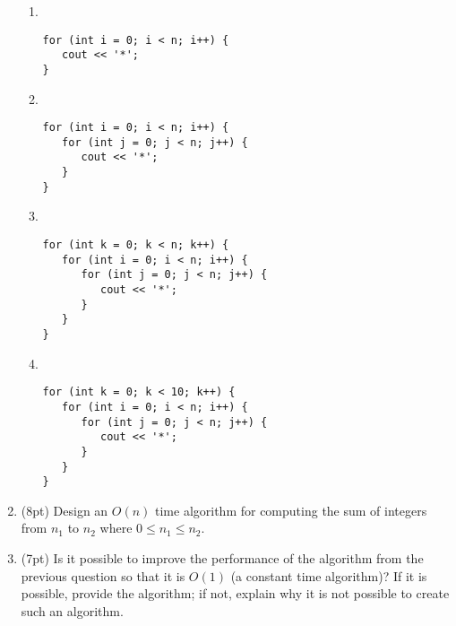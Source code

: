 \documentclass{article}
\newcommand{\pts}[1]{\addtocounter{points}{#1}(#1pt)}
\newcommand{\tspace}{\vspace{4cm}}
\begin{document}
\begin{spacing}{1.1}
\begin{enumerate}[leftmargin=*]
\begin{enumerate}

\item ~

\vspace{-\baselineskip}
\begin{lstlisting}[xleftmargin=.25in]
for (int i = 0; i < n; i++) {
   cout << '*';
}
\end{lstlisting} 

\tspace

\item ~

\vspace{-\baselineskip}
\begin{lstlisting}[xleftmargin=.25in]
for (int i = 0; i < n; i++) {
   for (int j = 0; j < n; j++) {
      cout << '*';
   }
}
\end{lstlisting} 

\tspace

\item ~

\vspace{-\baselineskip}
\begin{lstlisting}[numbers=none]
for (int k = 0; k < n; k++) {
   for (int i = 0; i < n; i++) {
      for (int j = 0; j < n; j++) {
         cout << '*';
      }
   }
}
\end{lstlisting} 

\tspace

\item ~

\vspace{-\baselineskip}
\begin{lstlisting}[numbers=none]
for (int k = 0; k < 10; k++) {
   for (int i = 0; i < n; i++) {
      for (int j = 0; j < n; j++) {
         cout << '*';
      }
   }
}
\end{lstlisting} 

\tspace

\end{enumerate}

\newpage

\item \pts{8} Design an $O(n)$ time algorithm for computing the sum of
  integers from $n_1$ to $n_2$ where $0 \le n_1 \le n_2$.

\tspace

\item \pts{7} Is it possible to improve the performance of the algorithm from
  the previous question so that it is $O(1)$ (a constant time
  algorithm)? If it is possible, provide the algorithm; if not,
  explain why it is not possible to create such an algorithm.


\end{enumerate}
\end{spacing}
\end{document}
